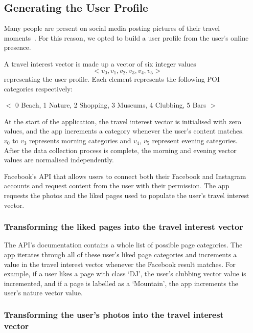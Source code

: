 
\subsection{Generating the User Profile}

Many people are present on social media posting
pictures of their travel moments~\cite{Miller2016}. For this reason, we opted to
build a user profile from the user's online presence.

A travel interest vector is made up a vector of six integer values
\[<v_0, v_1, v_2, v_3, v_4, v_5>\] representing the user profile.
Each element represents the following POI categories respectively: 

\begin{center}
    $<$
    0 Beach,
    1 Nature,
    2 Shopping,
    3 Museums,
    4 Clubbing,
    5 Bars $>$
    
\end{center}

At the start of the application, the
travel interest vector is initialised with zero
values, and the app increments a category whenever the
user's content matches. $v_0$ to $v_3$ represents morning categories
and $v_4$, $v_5$ represent evening categories. After
the data collection process is complete, the
morning and evening vector values are normalised independently. 

Facebook's API that allows users to connect both their Facebook
and Instagram accounts and request content from the user with their permission.
The app requests the photos and the liked pages used to 
populate the user's travel interest
vector. 

\subsubsection{Transforming the liked pages into the travel interest vector}

The API's documentation contains a whole list of possible
page categories. 
The app iterates through all of these user's liked
page categories and increments a value in the travel
interest vector whenever the Facebook result matches.
For example, if a user likes a page with class `DJ',
the user's clubbing vector value is incremented, and if a page is labelled as a
`Mountain', the app increments the user's nature vector value.

\subsubsection{Transforming the user's photos into the travel interest vector}


